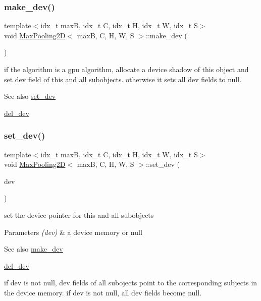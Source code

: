 \subsubsection{\texorpdfstring{make\+\_\+dev()}{make\_dev()}}
{\footnotesize\ttfamily template$<$idx\+\_\+t maxB, idx\+\_\+t C, idx\+\_\+t H, idx\+\_\+t W, idx\+\_\+t S$>$ \\
void \hyperlink{structMaxPooling2D}{Max\+Pooling2D}$<$ maxB, C, H, W, S $>$\+::make\+\_\+dev (\begin{DoxyParamCaption}{ }\end{DoxyParamCaption})\hspace{0.3cm}{\ttfamily [inline]}}



if the algorithm is a gpu algorithm, allocate a device shadow of this object and set dev field of this and all subobjects. otherwise it sets all dev fields to null. 

\begin{DoxySeeAlso}{See also}
\hyperlink{structMaxPooling2D_ab534c745a6fbfac5a8bd1718a1510dbe}{set\+\_\+dev} 

\hyperlink{structMaxPooling2D_a5d3cd9d8a476ae96cb7f86b5a0409f72}{del\+\_\+dev} 
\end{DoxySeeAlso}
\mbox{\label{structMaxPooling2D_ab534c745a6fbfac5a8bd1718a1510dbe}} 
\subsubsection{\texorpdfstring{set\+\_\+dev()}{set\_dev()}}
{\footnotesize\ttfamily template$<$idx\+\_\+t maxB, idx\+\_\+t C, idx\+\_\+t H, idx\+\_\+t W, idx\+\_\+t S$>$ \\
void \hyperlink{structMaxPooling2D}{Max\+Pooling2D}$<$ maxB, C, H, W, S $>$\+::set\+\_\+dev (\begin{DoxyParamCaption}\item[{\hyperlink{structMaxPooling2D}{Max\+Pooling2D}$<$ maxB, C, H, W, S $>$ $\ast$}]{dev }\end{DoxyParamCaption})\hspace{0.3cm}{\ttfamily [inline]}}



set the device pointer for this and all subobjects 


\begin{DoxyParams}{Parameters}
{\em (dev)} & a device memory or null \\
\hline
\end{DoxyParams}
\begin{DoxySeeAlso}{See also}
\hyperlink{structMaxPooling2D_a2cb8392bfcf78dc55e7157ef3095364e}{make\+\_\+dev} 

\hyperlink{structMaxPooling2D_a5d3cd9d8a476ae96cb7f86b5a0409f72}{del\+\_\+dev}
\end{DoxySeeAlso}
if dev is not null, dev fields of all subojects point to the corresponding subjects in the device memory. if dev is not null, all dev fields become null. 

